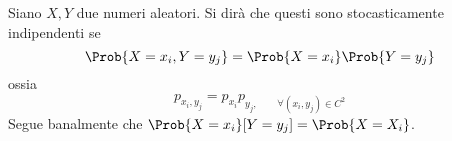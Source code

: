\documentclass{subfiles}
\begin{document}
Siano $X, Y$ due numeri aleatori. Si dirà che questi sono stocasticamente indipendenti se
$$
    \Prob{X = x_{i}, Y = y_{j}} = \Prob{X = x_{i}} \Prob{Y = y_{j}}
$$
ossia
$$
    p_{x_{i}, y_{j}} = p_{x_{i}} p_{y_{j}, \qquad \forall (x_{i}, y_{j}) \in C^{2}}
$$
Segue banalmente che $\Prob{X = x_{i}}[Y = y_{j}] = \Prob{X = X_{i}}$.
\end{document}
